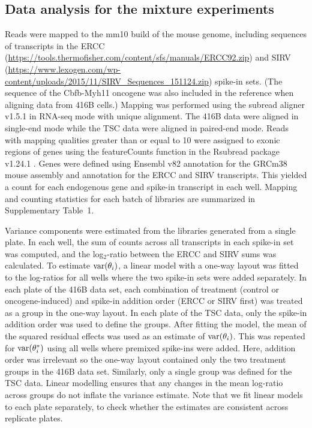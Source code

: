 \documentclass{article}
\newcommand{\supptabstats}{1}
\begin{document}
\subsection{Data analysis for the mixture experiments}
Reads were mapped to the mm10 build of the mouse genome, including sequences of transcripts in the ERCC (\url{https://tools.thermofisher.com/content/sfs/manuals/ERCC92.zip}) and SIRV (\url{https://www.lexogen.com/wp-content/uploads/2015/11/SIRV_Sequences_151124.zip}) spike-in sets.
(The sequence of the Cbfb-Myh11 oncogene was also included in the reference when aligning data from 416B cells.)
Mapping was performed using the subread aligner v1.5.1 \cite{liao2013subread} in RNA-seq mode with unique alignment.
The 416B data were aligned in single-end mode while the TSC data were aligned in paired-end mode.
Reads with mapping qualities greater than or equal to 10 were assigned to exonic regions of genes using the featureCounts function in the Rsubread package v1.24.1 \cite{liao2014featurecounts}.
Genes were defined using Ensembl v82 annotation for the GRCm38 mouse assembly and annotation for the ERCC and SIRV transcripts.
This yielded a count for each endogenous gene and spike-in transcript in each well.
Mapping and counting statistics for each batch of libraries are summarized in Supplementary Table~\supptabstats{}.

Variance components were estimated from the libraries generated from a single plate.
In each well, the sum of counts across all transcripts in each spike-in set was computed, and the log$_2$-ratio between the ERCC and SIRV sums was calculated.
To estimate $\mbox{var}(\theta_i)$, a linear model with a one-way layout was fitted to the log-ratios for all wells where the two spike-in sets were added separately.
In each plate of the 416B data set, each combination of treatment (control or oncogene-induced) and spike-in addition order (ERCC or SIRV first) was treated as a group in the one-way layout.
In each plate of the TSC data, only the spike-in addition order was used to define the groups.
After fitting the model, the mean of the squared residual effects was used as an estimate of $\mbox{var}(\theta_i)$.
This was repeated for $\mbox{var}(\theta^*_i)$ using all wells where premixed spike-ins were added.
Here, addition order was irrelevant so the one-way layout contained only the two treatment groups in the 416B data set.
Similarly, only a single group was defined for the TSC data.
Linear modelling ensures that any changes in the mean log-ratio across groups do not inflate the variance estimate.
Note that we fit linear models to each plate separately, to check whether the estimates are consistent across replicate plates.
\end{document}
